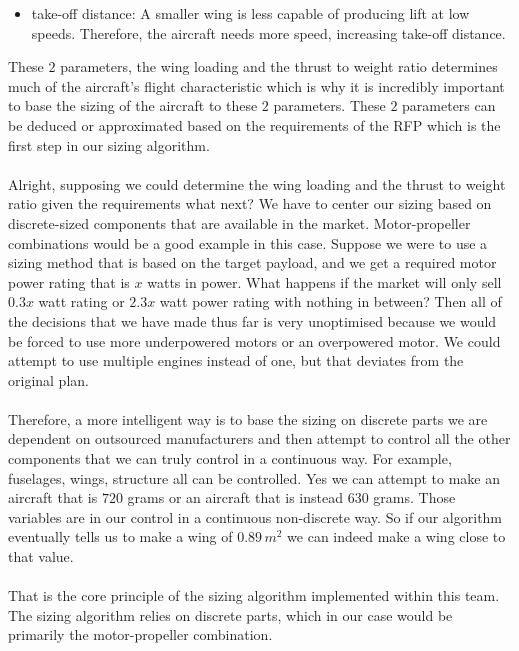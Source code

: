 \documentclass[letter, 12pt]{article}
\begin{document}
\begin{center}
\begin{enumerate}
\begin{itemize}
\item take-off distance: A smaller wing is less capable of producing lift at low speeds. Therefore, the aircraft needs more speed, increasing take-off distance.
\end{itemize}
\end{enumerate}
These $2$ parameters, the wing loading and the thrust to weight ratio determines much of the aircraft's flight characteristic which is why it is incredibly important to base the sizing of the aircraft to these $2$ parameters. These $2$ parameters can be deduced or approximated based on the requirements of the RFP which is the first step in our sizing algorithm.
\\~\\Alright, supposing we could determine the wing loading and the thrust to weight ratio given the requirements what next? We have to center our sizing based on discrete-sized components that are available in the market. Motor-propeller combinations would be a good example in this case. Suppose we were to use a sizing method that is based on the target payload, and we get a required motor power rating that is $x$ watts in power. What happens if the market will only sell $0.3x$ watt rating or $2.3x$ watt power rating with nothing in between? Then all of the decisions that we have made thus far is very unoptimised because we would be forced to use more underpowered motors or an overpowered motor. We could attempt to use multiple engines instead of one, but that deviates from the original plan. 
\\~\\Therefore, a more intelligent way is to base the sizing on discrete parts we are dependent on outsourced manufacturers and then attempt to control all the other components that we can truly control in a continuous way. For example, fuselages, wings, structure all can be controlled. Yes we can attempt to make an aircraft that is $720$ grams or an aircraft that is instead $630$ grams. Those variables are in our control in a continuous non-discrete way. So if our algorithm eventually tells us to make a wing of $0.89\,m^{2}$ we can indeed make a wing close to that value. 
\\~\\That is the core principle of the sizing algorithm implemented within this team. The sizing algorithm relies on discrete parts, which in our case would be primarily the motor-propeller combination.


\end{center}
\end{document}
